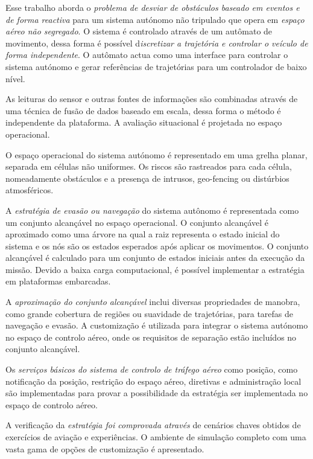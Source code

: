 \noindent Esse trabalho aborda o \textit{problema de desviar de obstáculos baseado em eventos e de forma reactiva} para um sistema autónomo não tripulado que opera em \textit{espaço aéreo não segregado}. O sistema é controlado através de um autômato de movimento, dessa forma é possível d\textit{iscretizar a trajetória e controlar o veículo de forma independente}. O autômato actua como uma interface  para controlar o sistema autónomo e gerar referências de trajetórias para um controlador de baixo nível.

As leituras do sensor e outras fontes de informações são combinadas através de uma técnica de fusão de dados baseado em escala, dessa forma o método é independente da plataforma. A avaliação situacional é projetada no espaço operacional.


O espaço operacional do sistema autónomo é representado em uma grelha planar, separada em células não uniformes. Os riscos são rastreados para cada célula, nomeadamente obstáculos e a presença de intrusos, geo-fencing ou distúrbios atmosféricos.


A\textit{ estratégia de evasão ou navegação} do sistema autônomo é representada como um conjunto alcançável no espaço operacional. O conjunto alcançável é aproximado como uma árvore na qual a raiz representa o estado inicial do sistema e os nós são os estados esperados após aplicar os movimentos. O conjunto alcançável é calculado para um conjunto de estados iniciais antes da execução da missão. Devido a baixa carga computacional, é possível implementar a estratégia em plataformas embarcadas.

A \textit{aproximação do conjunto alcançável} inclui diversas propriedades de manobra, como grande cobertura de regiões ou suavidade de trajetórias, para tarefas de navegação e evasão. A customização é utilizada para integrar o sistema autónomo no espaço de controlo aéreo, onde os requisitos de separação estão incluídos no conjunto alcançável.

Os \textit{serviços básicos do sistema de controlo de tráfego aéreo} como posição, como notificação da posição, restrição do espaço aéreo, diretivas e administração local são implementadas para provar a possibilidade da estratégia ser implementada no espaço de controlo aéreo.


A verificação da \textit{estratégia foi comprovada através} de cenários chaves obtidos de exercícios de  aviação e experiências. O ambiente de simulação completo com uma vasta gama de opções de customização é apresentado.
